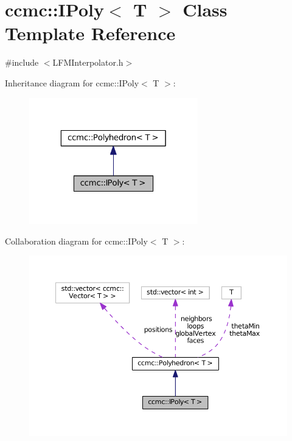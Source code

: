 \hypertarget{classccmc_1_1_i_poly}{\section{ccmc\-:\-:I\-Poly$<$ T $>$ Class Template Reference}
\label{classccmc_1_1_i_poly}
}


{\ttfamily \#include $<$L\-F\-M\-Interpolator.\-h$>$}



Inheritance diagram for ccmc\-:\-:I\-Poly$<$ T $>$\-:
\nopagebreak
\begin{figure}[H]
\begin{center}
\leavevmode
\includegraphics[width=208pt]{classccmc_1_1_i_poly__inherit__graph}
\end{center}
\end{figure}


Collaboration diagram for ccmc\-:\-:I\-Poly$<$ T $>$\-:
\nopagebreak
\begin{figure}[H]
\begin{center}
\leavevmode
\includegraphics[width=350pt]{classccmc_1_1_i_poly__coll__graph}
\end{center}
\end{figure}
